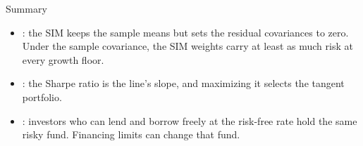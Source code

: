 \documentclass[aspectratio=169,11pt]{beamer}
\begin{document}
\begin{frame}{Summary}
\begin{itemize}\setlength{\itemsep}{0.9em}
\item {}: the SIM keeps the
sample means but sets the residual covariances to zero. Under the sample
covariance, the SIM weights carry at least as much risk at every growth floor.
\item {}: the Sharpe ratio is
the line's slope, and maximizing it selects the tangent portfolio.
\item {}: investors
who can lend and borrow freely at the risk-free rate hold the same risky fund.
Financing limits can change that fund.
\end{itemize}
\end{frame}

\end{document}
